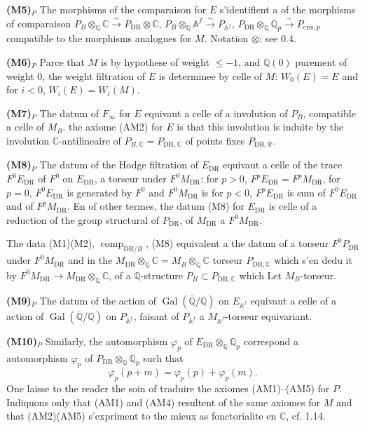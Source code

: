\documentclass[12pt,a4paper]{article}
\theoremstyle{plain}
\theoremstyle{definition}
\theoremstyle{remark}
\DeclareMathOperator{\Gal}{Gal}
\providecommand{\Gal}{\operatorname{Gal}}
\providecommand{\DR}{\mathrm{DR}}
\providecommand{\cris}{\mathrm{cris}}
\providecommand{\comp}{\operatorname{comp}}
\begin{document}
\textbf{(M5)$_P$} The morphisms of the comparaison for $E$ s'identifient a of the morphisms
of comparaison $P_B \otimes_{\mathbb{Q}} \mathbb{C} \xrightarrow{\sim} P_{\DR} \otimes
\mathbb{C}$, $P_B \otimes_{\mathbb{Q}} \mathbb{A}^f \xrightarrow{\sim}
P_{\mathbb{A}^f}$, $P_{\DR} \otimes_{\mathbb{Q}} \mathbb{Q}_p \xrightarrow{\sim}
P_{\cris,p}$ compatible to the morphisms analogues for $M$. Notation $\otimes$: see 0.4.

\textbf{(M6)$_P$} Parce that $M$ is by hypothese of weight $\leq -1$, and
$\mathbb{Q}(0)$ purement of weight $0$, the weight filtration of $E$ is
determinee by celle of $M$: $W_0(E) = E$ and for $i < 0$, $W_i(E) = W_i(M)$.

\textbf{(M7)$_P$} The datum of $F_\infty$ for $E$ equivaut a celle of a involution
of $P_B$, compatible a celle of $M_B$. the axiome (AM2) for $E$ is that this
involution is induite by the involution $\mathbb{C}$-antilineaire of $P_{B,\mathbb{C}} =
P_{\DR,\mathbb{C}}$ of points fixes $P_{\DR,\mathbb{R}}$.

\textbf{(M8)$_P$} The datum of the Hodge filtration of $E_{\DR}$ equivaut a celle
of the trace $F^0 E_{\DR}$ of $F^0$ on $E_{\DR}$, a torseur under $F^0 M_{\DR}$: for
$p > 0$, $F^p E_{\DR} = F^p M_{\DR}$, for $p = 0$, $F^0 E_{\DR}$ is generated by
$F^0$ and $F^0 M_{\DR}$ is for $p < 0$, $F^p E_{\DR}$ is sum of $F^0 E_{\DR}$ and of
$F^p M_{\DR}$. En of other termes, the datum (M8) for $E_{\DR}$ is celle of a
reduction of the group structural of $P_{\DR}$, of $M_{\DR}$ a $F^0 M_{\DR}$.

The data (M1)(M2), $\comp_{\DR/B}$, (M8) equivalent a the datum of a torseur
$F^0 P_{\DR}$ under $F^0 M_{\DR}$ and in the $M_{\DR} \otimes_{\mathbb{Q}} \mathbb{C} = M_B
\otimes_{\mathbb{Q}} \mathbb{C}$ torseur $P_{\DR,\mathbb{C}}$ which s'en dedu it by
$F^0 M_{\DR} \to M_{\DR} \otimes_{\mathbb{Q}} \mathbb{C}$, of a $\mathbb{Q}$-structure $P_B
\subset P_{\DR,\mathbb{C}}$ which Let $M_B$-torseur.

\textbf{(M9)$_P$} The datum of the action of $\Gal(\overline{\mathbb{Q}}/\mathbb{Q})$ on
$E_{\mathbb{A}^f}$ equivaut a celle of a action of
$\Gal(\overline{\mathbb{Q}}/\mathbb{Q})$ on $P_{\mathbb{A}^f}$, faisant of
$P_{\mathbb{A}^f}$ a $M_{\mathbb{A}^f}$-torseur equivariant.

\textbf{(M10)$_P$} Similarly, the automorphism $\varphi_p$ of $E_{\DR} \otimes_{\mathbb{Q}}
\mathbb{Q}_p$ correspond a automorphism $\varphi_p$ of $P_{\DR} \otimes_{\mathbb{Q}}
\mathbb{Q}_p$ such that
\[
\varphi_p(p + m) = \varphi_p(p) + \varphi_p(m).
\]
One laisse to the reader the soin of traduire the axiomes (AM1)--(AM5) for $P$. Indiquons
only that (AM1) and (AM4) resultent of the same axiomes for $M$ and that (AM2)(AM5)
s'expriment to the mieux as fonctorialite en $\mathbb{C}$, cf. 1.14.
\end{document}
